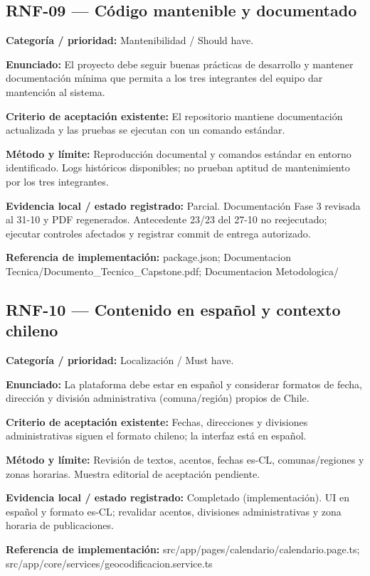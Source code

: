 \subsection{RNF-09 — Código mantenible y documentado}
\textbf{Categoría / prioridad:} Mantenibilidad / Should have.\par
\textbf{Enunciado:} El proyecto debe seguir buenas prácticas de desarrollo y mantener documentación mínima que permita a los tres integrantes del equipo dar mantención al sistema.\par
\textbf{Criterio de aceptación existente:} El repositorio mantiene documentación actualizada y las pruebas se ejecutan con un comando estándar.\par
\textbf{Método y límite:} Reproducción documental y comandos estándar en entorno identificado. Logs históricos disponibles; no prueban aptitud de mantenimiento por los tres integrantes.\par
\textbf{Evidencia local / estado registrado:} Parcial. Documentación Fase 3 revisada al 31-10 y PDF regenerados. Antecedente 23/23 del 27-10 no reejecutado; ejecutar controles afectados y registrar commit de entrega autorizado.\par
\textbf{Referencia de implementación:} package.json; Documentacion Tecnica/Documento\_Tecnico\_Capstone.pdf; Documentacion Metodologica/\par

\subsection{RNF-10 — Contenido en español y contexto chileno}
\textbf{Categoría / prioridad:} Localización / Must have.\par
\textbf{Enunciado:} La plataforma debe estar en español y considerar formatos de fecha, dirección y división administrativa (comuna/región) propios de Chile.\par
\textbf{Criterio de aceptación existente:} Fechas, direcciones y divisiones administrativas siguen el formato chileno; la interfaz está en español.\par
\textbf{Método y límite:} Revisión de textos, acentos, fechas es-CL, comunas/regiones y zonas horarias. Muestra editorial de aceptación pendiente.\par
\textbf{Evidencia local / estado registrado:} Completado (implementación). UI en español y formato es-CL; revalidar acentos, divisiones administrativas y zona horaria de publicaciones.\par
\textbf{Referencia de implementación:} src/app/pages/calendario/calendario.page.ts; src/app/core/services/geocodificacion.service.ts\par

